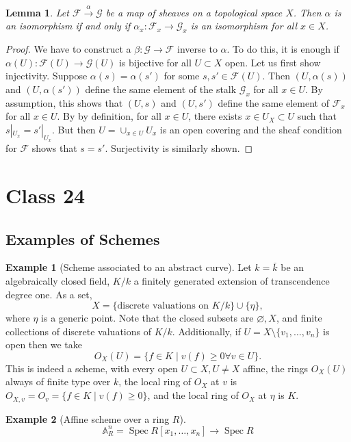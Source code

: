 \documentclass{article}
\DeclareMathOperator{\Spec}{Spec}
\theoremstyle{plain}
\newtheorem{lem}[thm]{Lemma}
\theoremstyle{definition}
\newtheorem{exmp}{Example}
\theoremstyle{remark}
\begin{document}
\begin{lem}
\label{SL6}
Let $\mathcal{F}\overset{\alpha}{\to}\mathcal{G}$ be a map of sheaves on a topological space $X$. Then $\alpha$ is an isomorphism if and only if $\alpha_x:\mathcal{F}_x\to\mathcal{G}_x$ is an isomorphism for all $x\in X$.
\end{lem}
\begin{proof}
We have to construct a $\beta:\mathcal{G}\to\mathcal{F}$ inverse to $\alpha$. To do this, it is enough if $\alpha(U):\mathcal{F}(U)\to\mathcal{G}(U)$ is bijective for all $U\subset X$ open. Let us first show injectivity. Suppose $\alpha(s)=\alpha(s')$ for some $s,s'\in\mathcal{F}(U)$. Then $(U,\alpha(s))$ and $(U,\alpha(s'))$ define the same element of the stalk $\mathcal{G}_x$ for all $x\in U$. By assumption, this shows that $(U,s)$ and $(U,s')$ define the same element of $\mathcal{F}_x$ for all $x\in U$. By by definition, for all $x\in U$, there exists $x\in U_X\subset U$ such that $s|_{U_x}=s'|_{U_x}$. But then $U=\cup_{x\in U}U_x$ is an open covering and the sheaf condition for $\mathcal{F}$ shows that $s=s'$. Surjectivity is similarly shown.
\end{proof}

\section*{Class 24}

\subsection*{Examples of Schemes}

\begin{exmp}[Scheme associated to an abstract curve]
Let $k=\bar k$ be an algebraically closed field, $K/k$ a finitely generated extension of transcendence degree one. As a set,
\[X=\{\text{discrete valuations on }K/k\}\cup\{\eta\},\]
where $\eta$ is a generic point. Note that the closed subsets are $\varnothing, X$, and finite collections of discrete valuations of $K/k$. Additionally, if $U=X\setminus\{v_1,\ldots,v_n\}$ is open then we take
\[O_X(U)=\{f\in K\mid v(f)\geq 0 \forall v\in U\}.\]
This is indeed a scheme, with every open $U\subset X, U\neq X$ affine, the rings $O_X(U)$ always of finite type over $k$, the local ring of $O_X$ at $v$ is $O_{X,v}=O_v=\{f\in K\mid v(f)\geq 0\}$, and the local ring of $O_X$ at $\eta$ is $K$.
\end{exmp}

\begin{exmp}[Affine scheme over a ring $R$]
\[\mathbb{A}^n_R=\Spec R[x_1,\ldots, x_n]\longrightarrow\Spec R\]
\end{exmp}
\end{document}
